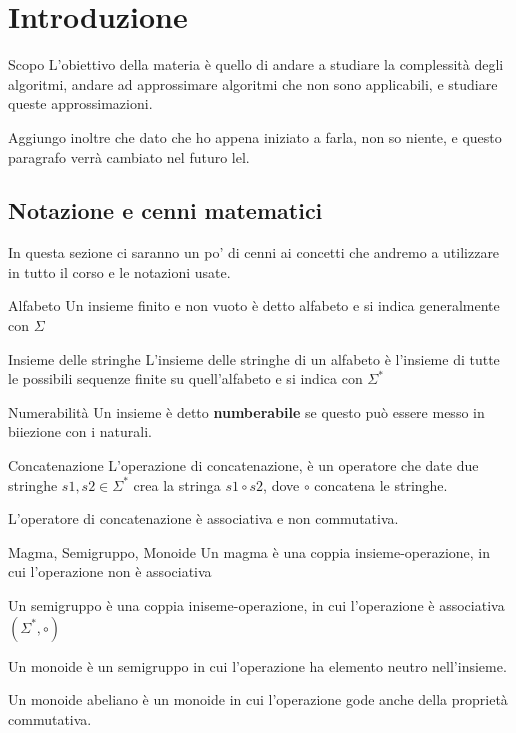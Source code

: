 \section{Introduzione}

\begin{paragrafo}{Scopo}
    L'obiettivo della materia è quello di andare a studiare la complessità degli algoritmi, andare ad approssimare algoritmi che non sono
    applicabili, e studiare queste approssimazioni.

    Aggiungo inoltre che dato che ho appena iniziato a farla, non so niente, e questo paragrafo verrà cambiato nel futuro lel. %
\end{paragrafo}

\subsection{Notazione e cenni matematici}

    In questa sezione ci saranno un po' di cenni ai concetti che andremo a utilizzare in tutto il corso e le notazioni usate.
    \separapassaggi
    \begin{paragrafo}{Alfabeto}
        Un insieme finito e non vuoto è detto alfabeto e si indica generalmente con $\Sigma$
    \end{paragrafo}

    \begin{paragrafo}{Insieme delle stringhe}
        L'insieme delle stringhe di un alfabeto è l'insieme di tutte le possibili sequenze finite su quell'alfabeto e si indica con $\Sigma^*$
    \end{paragrafo}
    
    \begin{paragrafo}{Numerabilità}
        Un insieme è detto \textbf{numberabile} se questo  può essere messo in biiezione con i naturali.
    \end{paragrafo}

    \begin{paragrafo}{Concatenazione}
        L'operazione di concatenazione, è un operatore che date due stringhe $s1,s2 \in \Sigma^*$ crea la stringa $s1 \circ s2$, dove $\circ$ concatena le stringhe.

        L'operatore di concatenazione è associativa e non commutativa.
    \end{paragrafo}

    \begin{paragrafo}{Magma, Semigruppo, Monoide }
        Un magma è una coppia insieme-operazione, in cui l'operazione non è associativa

        Un semigruppo è una coppia iniseme-operazione, in cui l'operazione è associativa $(\Sigma^*, \circ)$ 

        Un monoide è un semigruppo in cui l'operazione ha elemento neutro nell'insieme.

        Un monoide abeliano è un monoide in cui l'operazione gode anche della proprietà commutativa.
    \end{paragrafo}
    
